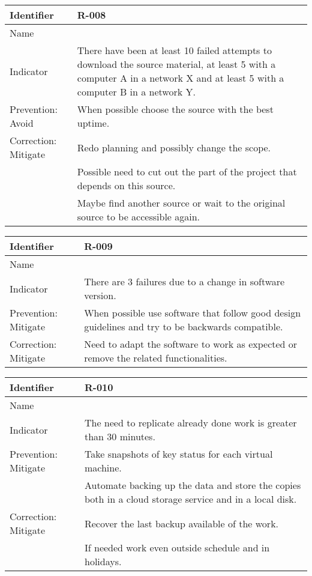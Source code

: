 \begin{table}[H]
	\begin{tabularx}{\textwidth}{|y|z|}
		\hline
		Identifier & \textbf{R-008} \\ \hline
		Name & \Rocho \\ \hline
		Indicator & There have been at least 10 failed attempts to download the source material, at least 5 with a computer A in a network X and at least 5 with a computer B in a network Y.\\ \hline
		Prevention: Avoid & When possible choose the source with the best uptime.\\ \hline
		Correction: Mitigate
			& Redo planning and possibly change the scope. \\
			& Possible need to cut out the part of the project that depends on this source. \\
			& Maybe find another source or wait to the original source to be accessible again.\\ \hline
	\end{tabularx}
\end{table}

\begin{table}[H]
	\begin{tabularx}{\textwidth}{|y|z|}
		\hline
		Identifier & \textbf{R-009} \\ \hline
		Name & \Rnueve \\ \hline
		Indicator & There are 3 failures due to a change in software version.\\ \hline
		Prevention: Mitigate & When possible use software that follow good design guidelines and try to be backwards compatible.\\ \hline
		Correction: Mitigate & Need to adapt the software to work as expected or remove the related functionalities. \\ \hline
	\end{tabularx}
\end{table}

\begin{table}[H]
	\begin{tabularx}{\textwidth}{|y|z|}
		\hline
		Identifier & \textbf{R-010} \\ \hline
		Name & \Rdiez \\ \hline
		Indicator & The need to replicate already done work is greater than 30 minutes.\\ \hline
		Prevention: Mitigate
			& Take snapshots of key status for each virtual machine.\\
			& Automate backing up the data and store the copies both in a cloud storage service and in a local disk.\\ \hline
		Correction: Mitigate
			& Recover the last backup available of the work. \\
			& If needed work even outside schedule and in holidays. \\ \hline
	\end{tabularx}
\end{table}

